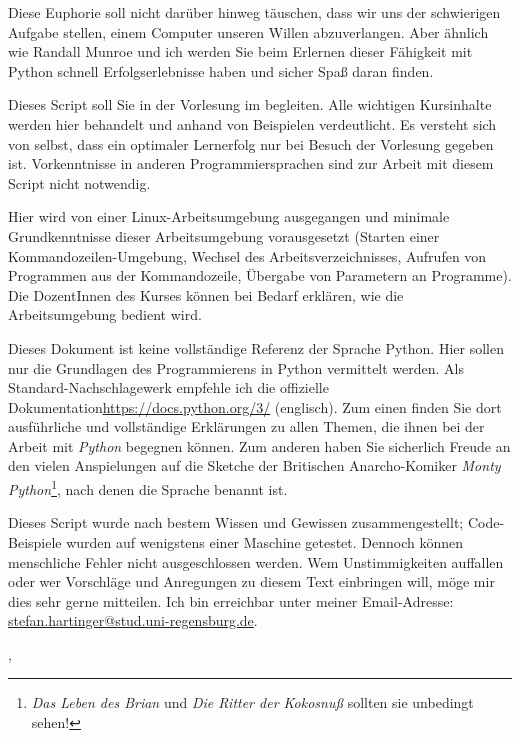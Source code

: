 Diese Euphorie soll nicht darüber hinweg täuschen, dass wir uns der schwierigen Aufgabe stellen, einem Computer unseren Willen abzuverlangen. Aber ähnlich wie Randall Munroe und ich werden Sie beim Erlernen dieser Fähigkeit mit Python schnell Erfolgserlebnisse haben und sicher Spaß daran finden.

Dieses Script soll Sie in der Vorlesung \emph{\myTitle} im \currentPeriod begleiten. Alle wichtigen Kursinhalte werden hier behandelt und anhand von Beispielen verdeutlicht. Es versteht sich von selbst, dass ein optimaler Lernerfolg nur bei Besuch der Vorlesung gegeben ist. Vorkenntnisse in anderen Programmiersprachen sind zur Arbeit mit diesem Script nicht notwendig.

Hier wird von einer Linux-Arbeits\-umgebung ausgegangen und minimale Grundkenntnisse dieser Arbeits\-umgebung vorausgesetzt (Starten einer Kommandozeilen-Umgebung, Wechsel des Arbeitsverzeichnisses, Aufrufen von Programmen aus der Kommandozeile, Übergabe von Parametern an Programme). Die DozentInnen des Kurses können bei Bedarf erklären, wie die Arbeitsumgebung bedient wird.

Dieses Dokument ist keine vollständige Referenz der Sprache Python. Hier sollen nur die Grundlagen des Programmierens in Python vermittelt werden. Als Standard-Nachschlagewerk empfehle ich die offizielle Dokumentation\url{https://docs.python.org/3/} (englisch). Zum einen finden Sie dort ausführliche und vollständige Erklärungen zu allen Themen, die ihnen bei der Arbeit mit \emph{Python} begegnen können. Zum anderen haben Sie sicherlich Freude an den vielen Anspielungen auf die Sketche der Britischen Anarcho-Komiker \emph{Monty Python}\footnote{\emph{Das Leben des Brian} und \emph{Die Ritter der Kokosnuß} sollten sie unbedingt sehen!}, nach denen die Sprache benannt ist.

Dieses Script wurde nach bestem Wissen und Gewissen zusammengestellt; Code-Beispiele wurden auf wenigstens einer Maschine getestet. Dennoch können menschliche Fehler nicht ausgeschlossen werden. Wem Unstimmigkeiten auffallen oder wer Vorschläge und Anregungen zu diesem Text einbringen will, möge mir dies sehr gerne mitteilen. Ich bin erreichbar unter meiner Email-Adresse:\\ \url{stefan.hartinger@stud.uni-regensburg.de}.
\begin{flushright}
\myName, \myVersionTime
\end{flushright}